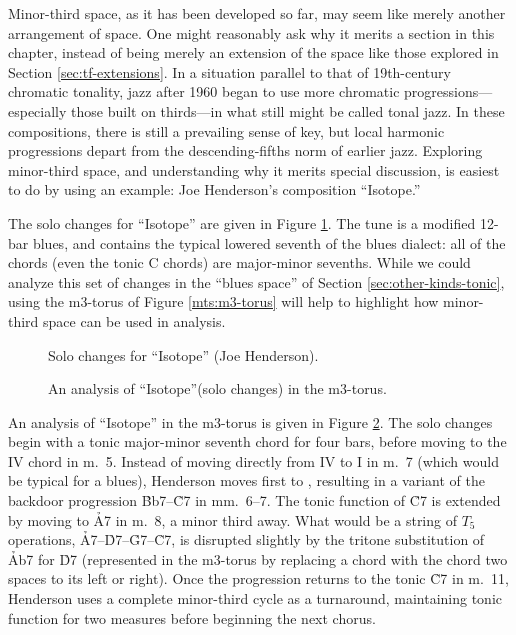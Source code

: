 Minor-third space, as it has been developed so far, may seem like merely
another arrangement of \tf space. One might reasonably ask why it merits a
section in this chapter, instead of being merely an extension of the space
like those explored in Section \ref{sec:tf-extensions}. In a situation
parallel to that of 19th-century chromatic tonality, jazz after 1960 began to
use more chromatic progressions---\allowbreak especially those built on
thirds---in what still might be called tonal jazz. In these compositions, there
is still a prevailing sense of key, but local harmonic progressions depart
from the descending-fifths norm of earlier jazz. Exploring
minor-third space, and understanding why it merits special discussion, is
easiest to do by using an example: Joe Henderson's composition
``Isotope.''

The solo changes for ``Isotope'' are given in Figure
\ref{mts:isotope-solo-changes}. The tune is a modified 12-bar blues,
and contains the typical lowered seventh of the blues dialect: all of the
chords (even the tonic C chords) are major-minor sevenths. While we could
analyze this set of changes in the ``blues \tf space'' of Section
\ref{sec:other-kinds-tonic}, using the m3-torus of Figure \ref{mts:m3-torus}
will help to highlight how minor-third space can be used in analysis.

\begin{figure}[tbp]
  \caption{Solo changes for ``Isotope'' (Joe Henderson).}
  \label{mts:isotope-solo-changes}
\end{figure}

\begin{figure}[tbp]
  \caption{An analysis of ``Isotope''(solo changes) in the m3-torus.}
  \label{mts:isotope-torus}
\end{figure}

An analysis of ``Isotope'' in the m3-torus is given in Figure
\ref{mts:isotope-torus}. The solo changes begin with a tonic major-minor
seventh chord for four bars, before moving to the IV chord in m.~5. Instead of
moving directly from IV to I in m.~7 (which would be typical for a blues),
Henderson moves first to \Bflat, resulting in a variant of the backdoor
progression \h{Bb7}--\h{C7} in mm.~6--7.  The tonic function of \h{C7} is
extended by moving to \h{A7} in m.~8, a minor
third away. What would be a string of $T_5$ operations,
\h{A7}--\h{D7}--\h{G7}--\h{C7}, is disrupted slightly by the tritone
substitution of \h{Ab7} for \h{D7} (represented in the m3-torus by replacing a
chord with the chord two spaces to its left or right). Once the progression
returns to the tonic \h{C7} in m.~11, Henderson uses a complete minor-third
cycle as a turnaround, maintaining tonic function for two measures before
beginning the next chorus.

